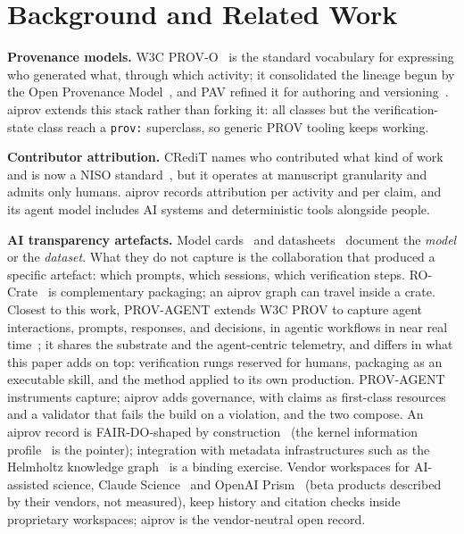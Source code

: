 \section{Background and Related Work}\label{sec:background}

\textbf{Provenance models.} W3C PROV-O~\cite{prov-o2013} is the
standard vocabulary for expressing who generated what, through which
activity; it consolidated the lineage begun by the Open Provenance
Model~\cite{opm2010}, and PAV refined it for authoring and
versioning~\cite{pav2013}. aiprov extends this stack rather
than forking it: all classes but the verification-state class reach a
\texttt{prov:} superclass, so generic PROV tooling keeps working.

\textbf{Contributor attribution.} CRediT names who contributed what
kind of work~\cite{credit2019} and is now a NISO
standard~\cite{credit-niso2022}, but it operates at manuscript
granularity and admits only humans. aiprov records attribution
per activity and per claim, and its agent model includes AI systems
and deterministic tools alongside people.

\textbf{AI transparency artefacts.} Model cards~\cite{modelcards2019}
and datasheets~\cite{datasheets2021} document the \emph{model} or the
\emph{dataset}. What they do not capture is the collaboration that
produced a specific artefact: which prompts, which sessions, which
verification steps. RO-Crate~\cite{rocrate2022} is complementary
packaging; an aiprov graph can travel inside a crate. Closest to this
work, PROV-AGENT extends W3C PROV to capture agent interactions,
prompts, responses, and decisions, in agentic workflows in near real
time~\cite{prov-agent2025}; it shares the substrate and the
agent-centric telemetry, and differs in what this paper adds on top:
verification rungs reserved for humans, packaging as an executable
skill, and the method applied to its own production.
PROV-AGENT instruments capture; aiprov adds governance, with claims as
first-class resources and a validator that fails the build on a
violation, and the two compose. An aiprov record is FAIR-DO-shaped by
construction~\cite{fairdo2020} (the kernel information
profile~\cite{hmc-kip2022} is the pointer); integration with metadata
infrastructures such as the Helmholtz knowledge
graph~\cite{unhide-helmholtz-kg} is a binding exercise. Vendor
workspaces for AI-assisted science, Claude Science~\cite{claude-science2026}
and OpenAI Prism~\cite{openai-prism2026} (beta products described by
their vendors, not measured), keep history and citation checks inside
proprietary workspaces; aiprov is the vendor-neutral open record.
\ifextended\fi

